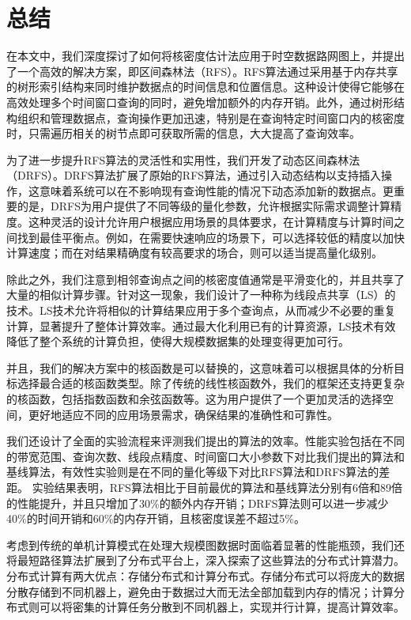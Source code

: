 \chapter{总结}

	在本文中，我们深度探讨了如何将核密度估计法应用于时空数据路网图上，并提出了一个高效的解决方案，即区间森林法（RFS）。RFS算法通过采用基于内存共享的树形索引结构来同时维护数据点的时间信息和位置信息。这种设计使得它能够在高效处理多个时间窗口查询的同时，避免增加额外的内存开销。此外，通过树形结构组织和管理数据点，查询操作更加迅速，特别是在查询特定时间窗口内的核密度时，只需遍历相关的树节点即可获取所需的信息，大大提高了查询效率。

	为了进一步提升RFS算法的灵活性和实用性，我们开发了动态区间森林法（DRFS）。DRFS算法扩展了原始的RFS算法，通过引入动态结构以支持插入操作，这意味着系统可以在不影响现有查询性能的情况下动态添加新的数据点。更重要的是，DRFS为用户提供了不同等级的量化参数，允许根据实际需求调整计算精度。这种灵活的设计允许用户根据应用场景的具体要求，在计算精度与计算时间之间找到最佳平衡点。例如，在需要快速响应的场景下，可以选择较低的精度以加快计算速度；而在对结果精确度有较高要求的场合，则可以适当提高量化级别。

	除此之外，我们注意到相邻查询点之间的核密度值通常是平滑变化的，并且共享了大量的相似计算步骤。针对这一现象，我们设计了一种称为线段点共享（LS）的技术。LS技术允许将相似的计算结果应用于多个查询点，从而减少不必要的重复计算，显著提升了整体计算效率。通过最大化利用已有的计算资源，LS技术有效降低了整个系统的计算负担，使得大规模数据集的处理变得更加可行。

	并且，我们的解决方案中的核函数是可以替换的，这意味着可以根据具体的分析目标选择最合适的核函数类型。除了传统的线性核函数外，我们的框架还支持更复杂的核函数，包括指数函数和余弦函数等。这为用户提供了一个更加灵活的选择空间，更好地适应不同的应用场景需求，确保结果的准确性和可靠性。
	
	我们还设计了全面的实验流程来评测我们提出的算法的效率。性能实验包括在不同的带宽范围、查询次数、线段点精度、时间窗口大小参数下对比我们提出的算法和基线算法，有效性实验则是在不同的量化等级下对比RFS算法和DRFS算法的差距。	实验结果表明，RFS算法相比于目前最优的算法和基线算法分别有6倍和89倍的性能提升，并且只增加了30\%的额外内存开销；DRFS算法则可以进一步减少40\%的时间开销和60\%的内存开销，且核密度误差不超过5\%。

	考虑到传统的单机计算模式在处理大规模图数据时面临着显著的性能瓶颈，我们还将最短路径算法扩展到了分布式平台上，深入探索了这些算法的分布式计算潜力。分布式计算有两大优点：存储分布式和计算分布式。存储分布式可以将庞大的数据分散存储到不同机器上，避免由于数据过大而无法全部加载到内存的情况；计算分布式则可以将密集的计算任务分散到不同机器上，实现并行计算，提高计算效率。

